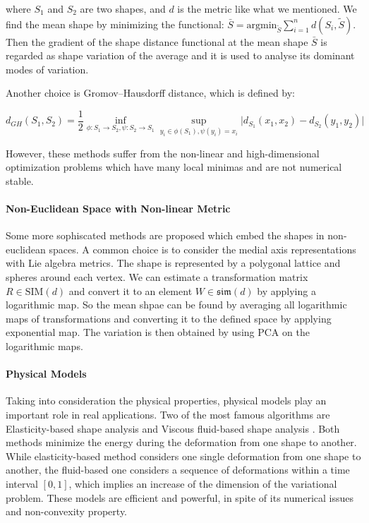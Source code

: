 \documentclass[11pt]{article}
\begin{document}
where $S_1$ and $S_2$ are two shapes, and $d$ is the metric like what we mentioned. 
We find the mean shape by minimizing the functional: $\bar{S} = \mbox{argmin}_{\tilde{S}} \sum_{i=1}^n d(S_i, \tilde{S})$.
Then the gradient of the shape distance functional at the mean shape $\bar{S}$ is regarded as shape variation of the average
and it is used to analyse its dominant modes of variation. 

Another choice is Gromov–Hausdorff distance, which is defined by:

\vspace{-1em}
$$
d_{GH} (S_1, S_2) = \frac{1}{2} \inf_{\phi: S_1 \to S_2, \psi: S_2 \to S_1} \sup_{y_i \in \phi(S_1), \psi (y_i) = x_i} \big |d_{S_1} (x_1, x_2) - d_{S_2} (y_1, y_2) \big|
$$
\vspace{-1em}

However, these methods suffer from the non-linear and high-dimensional optimization problems which have many local minimas and are not numerical stable.

\paragraph{Non-Euclidean Space with Non-linear Metric}
Some more sophiscated methods are proposed which embed the shapes in non-euclidean spaces.
A common choice is to consider the medial axis representations with Lie algebra metrics.
The shape is represented by a polygonal lattice and spheres around each vertex.
We can estimate a transformation matrix $R \in \mbox{SIM} (d)$ and convert it to an element $W \in \mathfrak{sim} (d)$ by applying a logarithmic map.
So the mean shpae can be found by averaging all logarithmic maps of transformations and converting it to the defined space by applying exponential map.
The variation is then obtained by using PCA on the logarithmic maps.

\paragraph{Physical Models} Taking into consideration the physical properties, physical models play an important role in real applications.
Two of the most famous algorithms are Elasticity-based shape analysis and Viscous fluid-based shape analysis \cite{rumpf2015variational}.
Both methods minimize the energy during the deformation from one shape to another. 
While elasticity-based method considers one single deformation from one shape to another, the fluid-based one considers a sequence of deformations within a time interval $[0, 1]$,
which implies an increase of the dimension of the variational problem.
These models are efficient and powerful, in spite of its numerical issues and non-convexity property.
\end{document}
